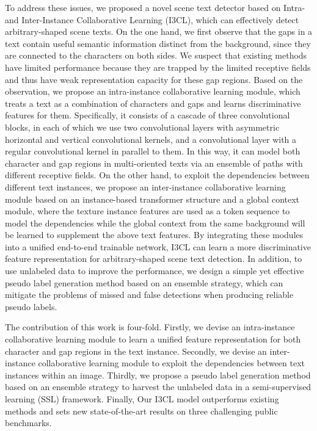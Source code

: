 To address these issues, we proposed a novel scene text detector based on Intra- and Inter-Instance Collaborative Learning (I3CL), which can effectively detect arbitrary-shaped scene texts. On the one hand, we first observe that the gaps in a text contain useful semantic information distinct from the background, since they are connected to the characters on both sides. We suspect that existing methods have limited performance because they are trapped by the limited receptive fields and thus have weak representation capacity for these gap regions. Based on the observation, we propose an intra-instance collaborative learning module, which treats a text as a combination of characters and gaps and learns discriminative features for them. Specifically, it consists of a cascade of three convolutional blocks, in each of which we use two convolutional layers with asymmetric horizontal and vertical convolutional kernels, and a convolutional layer with a regular convolutional kernel in parallel to them. In this way, it can model both character and gap regions in multi-oriented texts via an ensemble of paths with different receptive fields. On the other hand, to exploit the dependencies between different text instances, we propose an inter-instance collaborative learning module based on an instance-based transformer structure and a global context module, where the texture instance features are used as a token sequence to model the dependencies while the global context from the same background will be learned to supplement the above text features. By integrating these modules into a unified end-to-end trainable network, I3CL can learn a more discriminative feature representation for arbitrary-shaped scene text detection. In addition, to use unlabeled data to improve the performance, we design a simple yet effective pseudo label generation method based on an ensemble strategy, which can mitigate the problems of missed and false detections when producing reliable pseudo labels. 

The contribution of this work is four-fold. Firstly, we devise an intra-instance collaborative learning module to learn a unified feature representation for both character and gap regions in the text instance. Secondly, we devise an inter-instance collaborative learning module to exploit the dependencies between text instances within an image. Thirdly, we propose a pseudo label generation method based on an ensemble strategy to harvest the unlabeled data in a semi-supervised learning (SSL) framework. Finally, Our I3CL model outperforms existing methods and sets new state-of-the-art results on three challenging public benchmarks.



